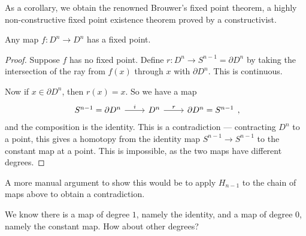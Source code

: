 \documentclass[a4paper]{article}
\theoremstyle{definition}
\begin{document}
As a corollary, we obtain the renowned Brouwer's fixed point theorem, a highly non-constructive fixed point existence theorem proved by a constructivist.
\begin{cor}
  Any map $f: D^n \to D^n$ has a fixed point.
\end{cor}

\begin{proof}
  Suppose $f$ has no fixed point. Define $r: D^n \to S^{n - 1} = \partial D^n$ by taking the intersection of the ray from $f(x)$ through $x$ with $\partial D^n$. This is continuous.
  \begin{center}
  \end{center}
  Now if $x \in \partial D^n$, then $r(x) = x$. So we have a map
  \[
    \begin{tikzcd}
      S^{n - 1} = \partial D^n \ar[r, "i"] & D^n \ar[r, "r"] & \partial D^n = S^{n - 1}
    \end{tikzcd},
  \]
  and the composition is the identity. This is a contradiction --- contracting $D^n$ to a point, this gives a homotopy from the identity map $S^{n - 1} \to S^{n - 1}$ to the constant map at a point. This is impossible, as the two maps have different degrees.
\end{proof}
A more manual argument to show this would be to apply $H_{n - 1}$ to the chain of maps above to obtain a contradiction.

We know there is a map of degree $1$, namely the identity, and a map of degree $0$, namely the constant map. How about other degrees?
\end{document}
